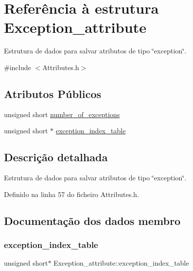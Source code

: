 \hypertarget{structException__attribute}{}\section{Referência à estrutura Exception\+\_\+attribute}
\label{structException__attribute}


Estrutura de dados para salvar atributos de tipo \char`\"{}exception\char`\"{}.  




{\ttfamily \#include $<$Attributes.\+h$>$}

\subsection*{Atributos Públicos}
\begin{DoxyCompactItemize}
\item 
unsigned short \hyperlink{structException__attribute_a120f2121de6e235a4532042a64feeb69}{number\+\_\+of\+\_\+exceptions}
\item 
unsigned short $\ast$ \hyperlink{structException__attribute_a67f14804de17f202aa3353e947f0a02f}{exception\+\_\+index\+\_\+table}
\end{DoxyCompactItemize}


\subsection{Descrição detalhada}
Estrutura de dados para salvar atributos de tipo \char`\"{}exception\char`\"{}. 

Definido na linha 57 do ficheiro Attributes.\+h.



\subsection{Documentação dos dados membro}
\mbox{\label{structException__attribute_a67f14804de17f202aa3353e947f0a02f}} 
\subsubsection{\texorpdfstring{exception\+\_\+index\+\_\+table}{exception\_index\_table}}
{\footnotesize\ttfamily unsigned short$\ast$ Exception\+\_\+attribute\+::exception\+\_\+index\+\_\+table}




